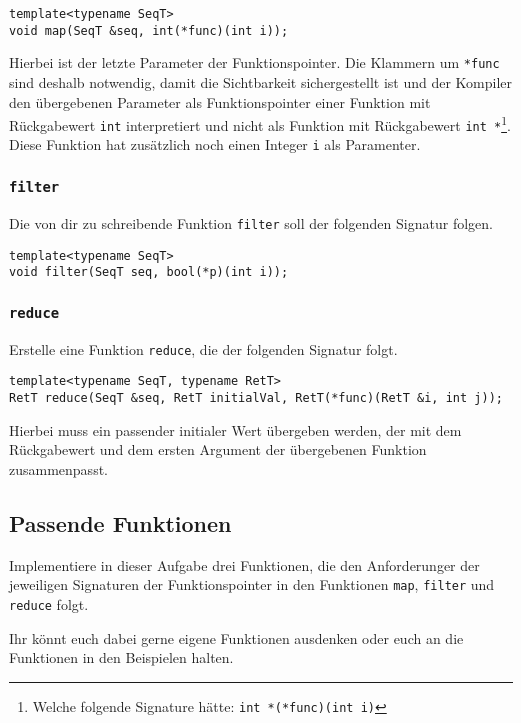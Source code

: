 \begin{lstlisting}
template<typename SeqT>
void map(SeqT &seq, int(*func)(int i));
\end{lstlisting}

Hierbei ist der letzte Parameter der Funktionspointer.
Die Klammern um \lstinline{*func} sind deshalb notwendig, damit die Sichtbarkeit sichergestellt ist und der Kompiler den übergebenen Parameter als Funktionspointer einer Funktion mit Rückgabewert \lstinline{int} interpretiert und nicht als Funktion mit Rückgabewert \lstinline{int *}\footnote{Welche folgende Signature hätte: \lstinline{int *(*func)(int i)}}.
Diese Funktion hat zusätzlich noch einen Integer \lstinline{i} als Paramenter.

\subsubsection{\lstinline{filter}}

Die von dir zu schreibende Funktion \lstinline{filter} soll der folgenden Signatur folgen.

\begin{lstlisting}
template<typename SeqT>
void filter(SeqT seq, bool(*p)(int i));
\end{lstlisting}

\subsubsection{\lstinline{reduce}}

Erstelle eine Funktion \lstinline{reduce}, die der folgenden Signatur folgt.

\begin{lstlisting}
template<typename SeqT, typename RetT>
RetT reduce(SeqT &seq, RetT initialVal, RetT(*func)(RetT &i, int j));
\end{lstlisting}

Hierbei muss ein passender initialer Wert übergeben werden, der mit dem Rückgabewert und dem ersten Argument der übergebenen Funktion zusammenpasst.

\subsection{Passende Funktionen}
Implementiere in dieser Aufgabe drei Funktionen, die den Anforderunger der jeweiligen Signaturen der Funktionspointer in den Funktionen \lstinline{map}, \lstinline{filter} und \lstinline{reduce} folgt.

Ihr könnt euch dabei gerne eigene Funktionen ausdenken oder euch an die Funktionen in den Beispielen halten.
